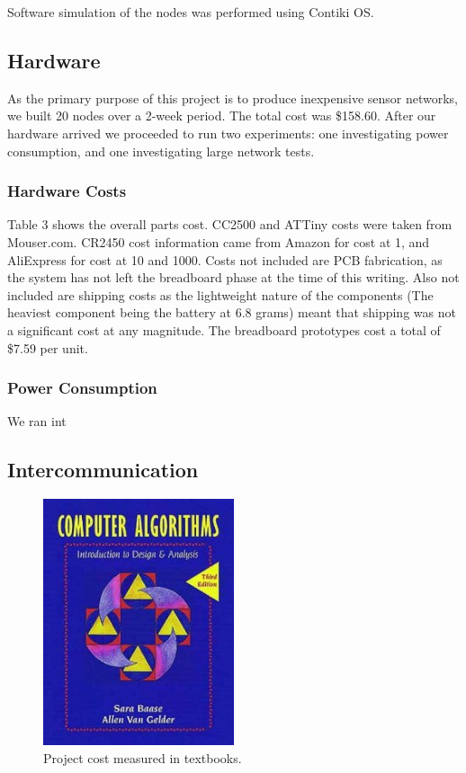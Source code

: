 Software simulation of the nodes was performed using Contiki OS. 

\subsection{Hardware}

As the primary purpose of this project is to produce inexpensive sensor networks, we built 20 nodes over a 2-week period. The total cost was \$158.60. After our hardware arrived we proceeded to run two experiments: one investigating power consumption, and one investigating large network tests.

\subsubsection{Hardware Costs}

Table 3 shows the overall parts cost. CC2500 and ATTiny costs were taken from Mouser.com. CR2450 cost information came from Amazon for cost at 1, and AliExpress for cost at 10 and 1000. Costs not included are PCB fabrication, as the system has not left the breadboard phase at the time of this writing. Also not included are shipping costs as the lightweight nature of the components (The heaviest component being the battery at 6.8 grams) meant that shipping was not a significant cost at any magnitude. The breadboard prototypes cost a total of \$7.59 per unit.

\subsubsection{Power Consumption}

We ran int

\subsection{Intercommunication}

\begin{figure}[h!]
  \centering
  \includegraphics[width=0.5\textwidth]{images/textbook.png}
  \caption{Project cost measured in textbooks.
  \label{img:flowchart}
  }
\end{figure}

